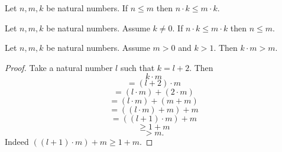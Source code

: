 \documentclass[10pt]{article}
\begin{document}
  \begin{forthel}
    \begin{corollary}
      Let $n, m, k$ be natural numbers.
      If $n \leq m$ then $n \cdot k \leq m \cdot k$.
    \end{corollary}
  \end{forthel}

  \begin{forthel}
    \begin{corollary}
      Let $n, m, k$ be natural numbers.
      Assume $k \neq 0$.
      If $n \cdot k \leq m \cdot k$ then $n \leq m$.
    \end{corollary}
  \end{forthel}

  \begin{forthel}
    \begin{proposition}
      Let $n, m, k$ be natural numbers.
      Assume $m > 0$ and $k > 1$.
      Then $k \cdot m > m$.
    \end{proposition}
    \begin{proof}
      Take a natural number $l$ such that $k = l + 2$.
      Then
      \[  k \cdot m                       \]
      \[    = (l + 2) \cdot m             \]
      \[    = (l \cdot m) + (2 \cdot m)   \]
      \[    = (l \cdot m) + (m + m)       \]
      \[    = ((l \cdot m) + m) + m       \]
      \[    = ((l + 1) \cdot m) + m       \]
      \[    \geq 1 + m                    \]
      \[    > m.                          \]
      Indeed $((l + 1) \cdot m) + m \geq 1 + m$.
    \end{proof}
  \end{forthel}
\end{document}

